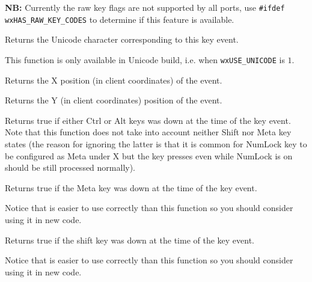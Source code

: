 {\bf NB:} Currently the raw key flags are not supported by all ports, use
{\tt \#ifdef wxHAS\_RAW\_KEY\_CODES} to determine if this feature is available.


\label{wxkeyeventgetunicodekey}


Returns the Unicode character corresponding to this key event.

This function is only available in Unicode build, i.e. when
\texttt{wxUSE\_UNICODE} is $1$.


\label{wxkeyeventgetx}


Returns the X position (in client coordinates) of the event.


\label{wxkeyeventgety}


Returns the Y (in client coordinates) position of the event.


\label{wxkeyeventhasmodifiers}


Returns true if either {\sc Ctrl} or {\sc Alt} keys was down
at the time of the key event. Note that this function does not take into
account neither {\sc Shift} nor {\sc Meta} key states (the reason for ignoring
the latter is that it is common for {\sc NumLock} key to be configured as
{\sc Meta} under X but the key presses even while {\sc NumLock} is on should
be still processed normally).


\label{wxkeyeventmetadown}


Returns true if the Meta key was down at the time of the key event.

Notice that  is easier to use
correctly than this function so you should consider using it in new code.


\label{wxkeyeventshiftdown}


Returns true if the shift key was down at the time of the key event.

Notice that  is easier to use
correctly than this function so you should consider using it in new code.

